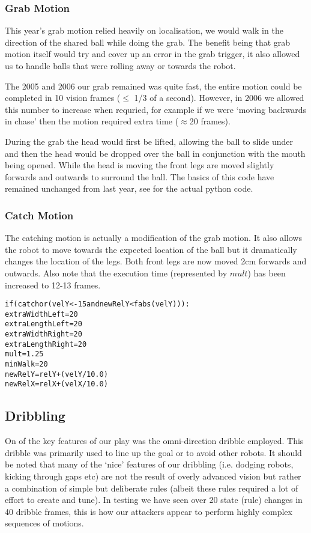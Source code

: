 \subsubsection{Grab Motion}

This year's grab motion relied heavily on localisation, we would
walk in the direction of the shared ball while doing the grab. The
benefit being that grab motion itself would try and cover up an
error in the grab trigger, it also allowed us to handle balls that
were rolling away or towards the robot.

The 2005 and 2006 our grab remained was quite fast, the entire motion could be
completed in 10 vision frames ($\leq$ 1/3 of a second). However, in 2006 we allowed this number to increase when requried, for example if we were `moving backwards in chase' then the motion required extra time ($\approx$20 frames).

During the grab the head would first be lifted, allowing the ball to
slide under and then the head would be dropped over the ball in
conjunction with the mouth being opened. While the head is moving
the front legs are moved slightly forwards and outwards to surround
the ball. The basics of this code have remained unchanged from last year, see  \cite{NUBOT2005} for the actual python code.

\subsubsection{Catch Motion}
\label{bvr:catch}
The catching motion is actually a modification of the grab motion. It also allows the robot to move towards the expected location of the ball but it dramatically changes the location of the legs. Both front legs are now moved 2cm forwards and outwards. Also note that the execution time (represented by $mult$) has been increased to 12-13 frames.

\begin{alltt}
  if (catch or (velY < -15 and newRelY < fabs(velY))): 
    extraWidthLeft = 20
    extraLengthLeft = 20
    extraWidthRight = 20
    extraLengthRight = 20
    mult = 1.25
    minWalk = 20
    newRelY = relY+(velY/10.0)
    newRelX = relX+(velX/10.0)
\end{alltt}
 

\subsection{Dribbling}

On of the key features of our play was the omni-direction
dribble employed. This dribble was primarily used to line up the
goal or to avoid other robots. It should be noted that many of the
`nice' features of our dribbling (i.e. dodging robots, kicking
through gaps etc) are not the result of overly advanced vision but
rather a combination of simple but deliberate rules (albeit these
rules required a lot of effort to create and tune). In testing we have seen over 20 state (rule) changes in 40 dribble frames, this is how our attackers appear to perform highly complex sequences of motions.

